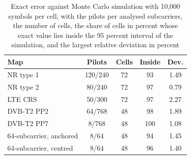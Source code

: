 \begin{table}[t]
\caption{Exact error against Monte Carlo simulation with 10,000 symbols per cell, with the pilots per analysed subcarriers, the number of cells, the share of cells in percent whose exact value lies inside the 95 percent interval of the simulation, and the largest relative deviation in percent}
\label{tab:validation}
\centering
\footnotesize
\setlength{\tabcolsep}{1.8pt}
\begin{tabular}{lcccc}
\toprule
Map & Pilots & Cells & Inside & Dev. \\
\midrule
NR type 1 & 120/240 & 72 & 93 & 1.49 \\
NR type 2 & 80/240 & 72 & 97 & 0.79 \\
LTE CRS & 50/300 & 72 & 97 & 2.27 \\
DVB-T2 PP2 & 64/768 & 48 & 98 & 1.89 \\
DVB-T2 PP7 & 8/768 & 48 & 100 & 1.08 \\
64-subcarrier, anchored & 8/64 & 48 & 94 & 1.45 \\
64-subcarrier, centred & 8/64 & 48 & 96 & 1.40 \\
\bottomrule
\end{tabular}
\end{table}
